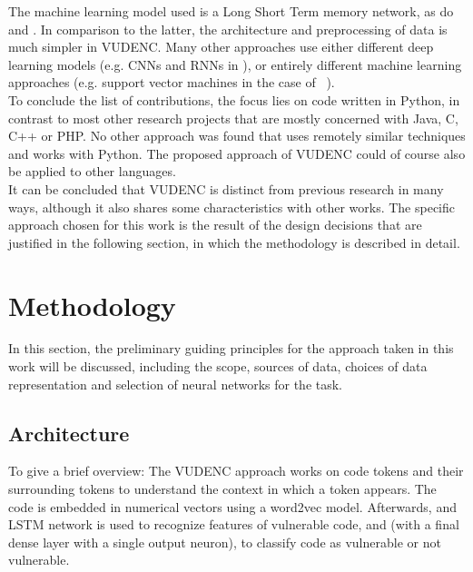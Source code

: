 \documentclass[
a4paper,
pagesize,
pdftex,
12pt,
twoside, %
BCOR=5mm, %
ngerman,
fleqn,
final,
]{scrartcl}
\begin{document}
	The machine learning model used is a Long Short Term memory network, as do \cite{Li.2018} and \cite{Dam.2017}. In comparison to the latter, the architecture and preprocessing of data is much simpler in VUDENC. Many other approaches use either different deep learning models (e.g. CNNs and RNNs in \cite{Russell.2018}), or entirely different machine learning approaches (e.g. support vector machines in the case of ~\cite{Pang.2015}).\\
	To conclude the list of contributions, the focus lies on code written in Python, in contrast to most other research projects that are mostly concerned with Java, C, C++ or PHP. No other approach was found that uses remotely similar techniques and works with Python. The proposed approach of VUDENC could of course also be applied to other languages.\\
	It can be concluded that VUDENC is distinct from previous research in many ways, although it also shares some characteristics with other works. The specific approach chosen for this work is the result of the design decisions that are justified in the following section, in which the methodology is described in detail.
	
	
	\newpage
	\section{Methodology}\label{Methodology}
	In this section, the  preliminary guiding principles for the approach taken in this work will be discussed, including the scope, sources of data, choices of data representation and selection of neural networks for the task. 
	
	\subsection{Architecture}
	To give a brief overview: The VUDENC approach works on code tokens and their surrounding tokens to understand the context in which a token appears. The code is embedded in numerical vectors using a word2vec model. Afterwards, and LSTM network is used to recognize features of vulnerable code, and (with a final dense layer with a single output neuron), to classify code as vulnerable or not vulnerable.  
	
\end{document}
